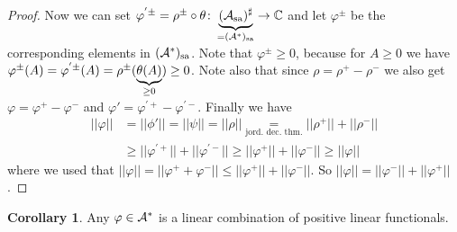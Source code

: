 \documentclass[10pt,english,a4paper]{article}
\theoremstyle{definition}
\newtheorem*{corollary}{Corollary}
\def\Assa{\As_{\text{sa}}}
\def\sa{\text{sa}}
\def\vphi{\varphi}
\begin{document}
\begin{proof}
Now we can set $\vphi^{'\pm} = \rho^{\pm} \circ \theta \colon \ub{(\Assa)^{\sharp}}_{=(\As^{*})_{\sa}}\to \C$
and let $\vphi^{\pm}$ be the corresponding elements in $(\As^*)_{\sa}$.
Note that $\vphi^{\pm}\geq 0$, because 
for $A\geq 0$ we have $\vphi^{\pm}(A) = \vphi^{'\pm}(A) =
\rho^{\pm}(\ub{\theta(A)}_{\geq 0})\geq 0$. 
Note also that since $\rho = \rho^+ - \rho^-$ we also get $\vphi = \vphi^+ -\vphi^-$
and $\vphi' = \vphi^{'+} - \vphi^{'-}$. Finally we have 
 \begin{align*}
     ||\vphi|| &= ||\phi'|| = ||\psi|| = ||\rho||\underset{\text{jord. dec. thm.}}{=}
    ||\rho^+|| + ||\rho^-|| \\ 
    &\geq ||\vphi^{'+}|| +  ||\vphi^{'-}||
 \geq ||\vphi^{+}|| +  ||\vphi^{-}||\geq ||\vphi||
\end{align*}
where we used that  $||\vphi|| = ||\vphi^+ + \vphi^-|| \leq ||\vphi^+|| + ||\vphi^-||$.
So $||\vphi|| = ||\vphi^-|| +||\vphi^+||$.
\end{proof}
\begin{corollary}
    Any $\varphi \in \mathcal{A}^*$ is a linear combination of positive linear functionals.
\end{corollary}
\end{document}
